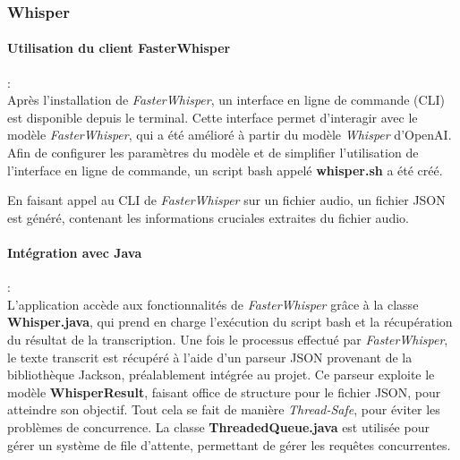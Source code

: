 \subsubsection{Whisper}
\label{sec:whisperImpl}

\paragraph*{Utilisation du client FasterWhisper} : \\ Après l'installation de
\textit{FasterWhisper}, un interface en ligne de commande (CLI) est disponible
depuis le terminal. Cette interface permet d'interagir avec le modèle
\textit{FasterWhisper}, qui a été amélioré à partir du modèle \textit{Whisper}
d'OpenAI. Afin de configurer les paramètres du modèle et de simplifier
l'utilisation de l'interface en ligne de commande, un script bash appelé
\textbf{whisper.sh} a été créé.

En faisant appel au CLI de \textit{FasterWhisper} sur un fichier audio, un
fichier JSON est généré, contenant les informations cruciales extraites du
fichier audio.

\paragraph*{Intégration avec Java}: \\ L'application accède aux fonctionnalités de
\textit{FasterWhisper} grâce à la classe \textbf{Whisper.java}, qui prend en
charge l'exécution du script bash et la récupération du résultat de la
transcription. Une fois le processus effectué par \textit{FasterWhisper}, le
texte transcrit est récupéré à l'aide d'un parseur JSON provenant de la
bibliothèque Jackson, préalablement intégrée au projet. Ce parseur exploite le
modèle \textbf{WhisperResult}, faisant office de structure pour le fichier
JSON, pour atteindre son objectif. Tout cela se fait de manière
\textit{Thread-Safe}, pour éviter les problèmes de concurrence. La classe
\textbf{ThreadedQueue.java} est utilisée pour gérer un système de file
d'attente, permettant de gérer les requêtes concurrentes.
